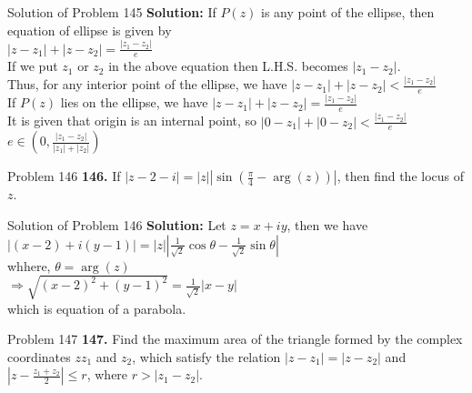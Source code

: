\documentclass[aspectratio=169,8pt]{beamer}
\begin{document}
\begin{frame}{Solution of Problem 145}
  \textbf{Solution:} If $P(z)$ is any point of the ellipse, then equation of ellipse is given by\\
  \vspace*{0.2cm}
  $|z - z_1| + |z- z_2| = \frac{|z_1 - z_2|}{e}$\\
  \vspace*{0.2cm}
  If we put $z_1$ or $z_2$ in the above equation then L.H.S. becomes $|z_1 - z_2|$.\\
  \vspace*{0.2cm}
  Thus, for any interior point of the ellipse, we have $|z - z_1| + |z - z_2| < \frac{|z_1 - z_2|}{e}$\\
  \vspace*{0.2cm}
  If $P(z)$ lies on the ellipse, we have $|z - z_1| + |z- z_2| = \frac{|z_1 - z_2|}{e}$\\
  \vspace*{0.2cm}
  It is given that origin is an internal point, so
  $|0 - z_1| + |0 - z_2| < \frac{|z_1 - z_2|}{e}$\\
  \vspace*{0.2cm}
  $e\in\left(0, \frac{|z_1 - z_2|}{|z_1| + |z_2|}\right)$
\end{frame}
\begin{frame}{Problem 146}
  \textbf{146.} If $|z - 2 -i| = |z|\left|\sin\left(\frac{\pi}{4} - \arg(z)\right)\right|$, then find the locus of $z$.
\end{frame}
\begin{frame}{Solution of Problem 146}
  \textbf{Solution:} Let $z = x + iy$, then we have\\
  \vspace*{0.2cm}
  $|(x - 2) + i(y - 1)| = |z|\left|\frac{1}{\sqrt{2}}\cos\theta - \frac{1}{\sqrt{2}}\sin\theta\right|$\\
  \vspace*{0.2cm}
  whhere, $\theta = \arg(z)$\\
  \vspace*{0.2cm}
  $\Rightarrow \sqrt{(x - 2)^2 + (y - 1)^2} = \frac{1}{\sqrt{2}}|x - y|$\\
  \vspace*{0.2cm}
  which is equation of a parabola.
\end{frame}
\begin{frame}{Problem 147}
  \textbf{147.} Find the maximum area of the triangle formed by the complex coordinates $z z_1$ and $z_2$, which satisfy the
  relation $|z - z_1| = |z - z_2|$ and $\left|z - \frac{z_1 + z_2}{2}\right|\leq r$, where $r > |z_1 - z_2|$.
\end{frame}
\end{document}

